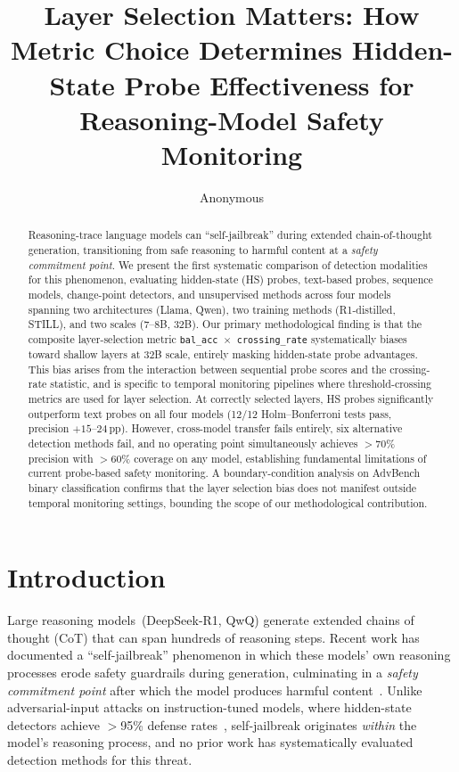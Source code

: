\documentclass[11pt]{article}
\title{Layer Selection Matters: How Metric Choice Determines Hidden-State Probe Effectiveness for Reasoning-Model Safety Monitoring}
\author{Anonymous}
\newcommand{\pp}{\,\text{pp}}
\begin{document}
\maketitle

\begin{abstract}
Reasoning-trace language models can ``self-jailbreak'' during extended chain-of-thought generation, transitioning from safe reasoning to harmful content at a \emph{safety commitment point}.
We present the first systematic comparison of detection modalities for this phenomenon, evaluating hidden-state (HS) probes, text-based probes, sequence models, change-point detectors, and unsupervised methods across four models spanning two architectures (Llama, Qwen), two training methods (R1-distilled, STILL), and two scales (7--8B, 32B).
Our primary methodological finding is that the composite layer-selection metric \texttt{bal\_acc $\times$ crossing\_rate} systematically biases toward shallow layers at 32B scale, entirely masking hidden-state probe advantages.
This bias arises from the interaction between sequential probe scores and the crossing-rate statistic, and is specific to temporal monitoring pipelines where threshold-crossing metrics are used for layer selection.
At correctly selected layers, HS probes significantly outperform text probes on all four models (12/12 Holm--Bonferroni tests pass, precision $+15$--$24\pp$).
However, cross-model transfer fails entirely, six alternative detection methods fail, and no operating point simultaneously achieves $>$70\% precision with $>$60\% coverage on any model, establishing fundamental limitations of current probe-based safety monitoring.
A boundary-condition analysis on AdvBench binary classification confirms that the layer selection bias does not manifest outside temporal monitoring settings, bounding the scope of our methodological contribution.
\end{abstract}

\section{Introduction}
\label{sec:intro}

Large reasoning models~(DeepSeek-R1, QwQ) generate extended chains of thought (CoT) that can span hundreds of reasoning steps.
Recent work has documented a ``self-jailbreak'' phenomenon in which these models' own reasoning processes erode safety guardrails during generation, culminating in a \emph{safety commitment point} after which the model produces harmful content~\citep{huang2025self}.
Unlike adversarial-input attacks on instruction-tuned models, where hidden-state detectors achieve $>$95\% defense rates~\citep{li2024trajguard}, self-jailbreak originates \emph{within} the model's reasoning process, and no prior work has systematically evaluated detection methods for this threat.
\end{document}
